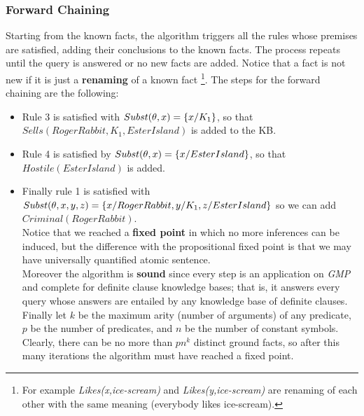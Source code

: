 \documentclass[10pt,a4paper]{article}
\begin{document}
\subsubsection{Forward Chaining}
Starting from the known facts, the algorithm triggers all the rules whose premises are satisfied, adding their conclusions to the known facts. The process repeats until the query is answered or no new facts are added. Notice that a fact is not new if it is just a \textbf{renaming} of a known fact \footnote{For example \textit{Likes(x,ice-scream)} and \textit{Likes(y,ice-scream)} are renaming of each other with the same meaning (everybody likes ice-scream).}.
The steps for the forward chaining are the following:
\begin{itemize}
\item Rule 3 is satisfied with $Subst(\theta,x)=\lbrace x/K_1 \rbrace$, so that $Sells(RogerRabbit,K_1,EsterIsland)$ is added to the KB.
\item Rule 4 is satisfied by $Subst(\theta,x)=\lbrace x/EsterIsland \rbrace$, so that $Hostile(EsterIsland)$ is added.
\item Finally rule 1 is satisfied with $Subst(\theta,x,y,z)=\lbrace x/RogerRabbit, y/K_1, z/EsterIsland \rbrace$ so we can add $Criminal(RogerRabbit)$.\\

Notice that we reached a \textbf{fixed point} in which no more inferences can be induced, but the difference with the propositional fixed point is that we may have universally quantified atomic sentence.\\
Moreover the algorithm is \textbf{sound} since every step is an application on \textit{GMP} and complete for definite clause knowledge bases; that is, it answers every query whose answers are entailed by any knowledge base of definite clauses.\\ Finally let $k$ be the maximum arity (number of arguments) of any predicate, $p$ be the number of predicates, and $n$ be the number of constant symbols. Clearly, there can be no more than $pn^k$ distinct ground facts, so after this many iterations the algorithm must have reached a fixed point.


\end{itemize}
\end{document}
